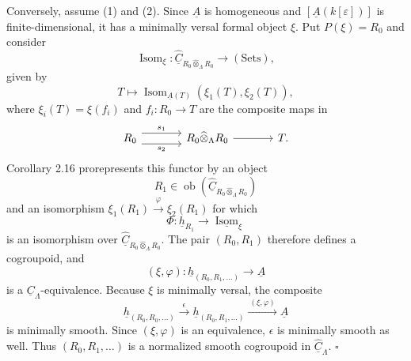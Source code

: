 Conversely, assume (1) and (2). Since $\underline A$ is homogeneous
and $[\underline A(k[\varepsilon])]$ is finite-dimensional, it has a
minimally versal formal object $\xi$. Put $P(\xi)=R_0$ and consider
\[
 \operatorname{Isom}_\xi:
 \widehat{\underline C}_{R_0\widehat\otimes_\Lambda R_0}
 \longrightarrow(\mathrm{Sets}),
\]
given by
\[
 T\longmapsto
 \operatorname{Isom}_{\underline A(T)}(\xi_1(T),\xi_2(T)),
\]
where $\xi_i(T)=\xi(f_i)$ and $f_i:R_0\longrightarrow T$ are the
composite maps in
\[
\begin{tikzcd}[column sep=large]
 R_0 \arrow[r,shift left=2,"s_1"]
     \arrow[r,shift right=2,"s_2"']
 & R_0\widehat\otimes_\Lambda R_0 \arrow[r] & T.
\end{tikzcd}
\]
Corollary 2.16 prorepresents this functor by an object
\[
 R_1\in
 \operatorname{ob}(\widehat{\underline C}_{R_0\widehat\otimes_\Lambda R_0})
\]
and an isomorphism
$\xi_1(R_1)\xrightarrow{\varphi}\xi_2(R_1)$ for which
\[
 \Phi:\underline h_{R_1}\longrightarrow
 \underline{\operatorname{Isom}}_\xi
\]
is an isomorphism over
$\widehat{\underline C}_{R_0\widehat\otimes_\Lambda R_0}$. The pair
$(R_0,R_1)$ therefore defines a cogroupoid, and
\[
 (\xi,\varphi):\underline h_{(R_0,R_1,\ldots)}
 \longrightarrow\underline A
\]
is a $\underline C_\Lambda$-equivalence. Because $\xi$ is minimally
versal, the composite
\[
 \underline h_{(R_0,R_0,\ldots)}
 \xrightarrow{\ \epsilon\ }
 \underline h_{(R_0,R_1,\ldots)}
 \xrightarrow{\ (\xi,\varphi)\ }
 \underline A
\]
is minimally smooth. Since $(\xi,\varphi)$ is an equivalence,
$\epsilon$ is minimally smooth as well. Thus
$(R_0,R_1,\ldots)$ is a normalized smooth cogroupoid in
$\widehat{\underline C}_\Lambda$. \hfill$\square$
